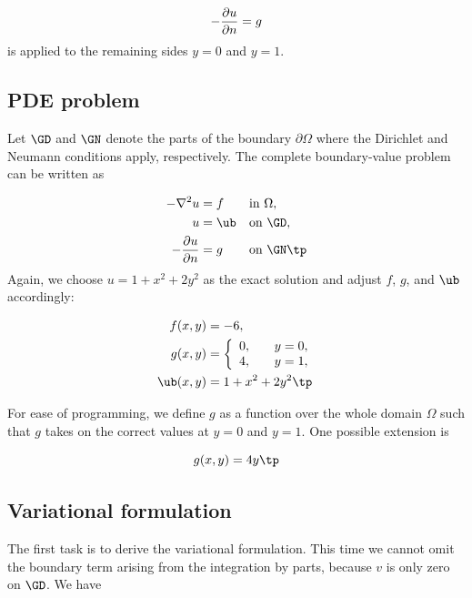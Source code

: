 \documentclass[graybox,envcountchap,sectrefs,final]{svmonodo}
\begin{document}
\begin{equation*}
-{\partial u\over\partial n}=g
\end{equation*}
is applied to the remaining
sides $y=0$ and $y=1$.



\subsection{PDE problem}

Let $\GD$ and $\GN$ denote the parts of the boundary $\partial\Omega$
where the Dirichlet and Neumann conditions apply, respectively. The
complete boundary-value problem can be written as

\begin{alignat}{2}
    - \nabla^2 u &= f \quad&&\mbox{in } \Omega,  \\
    u &= \ub &&\mbox{on } \GD,       \\
    - {\partial u\over\partial n} &= g &&\mbox{on } \GN  \tp
\end{alignat}
Again, we choose $u=1+x^2 + 2y^2$ as the exact solution and adjust $f$, $g$, and
$\ub$ accordingly:

\begin{align*}
f(x, y) &= -6,\\
g(x, y) &= \left\lbrace\begin{array}{ll}
0, & \quad y=0,\\
4, & \quad y=1,
\end{array}\right.\\
\ub(x, y) &= 1 + x^2 + 2y^2\tp
\end{align*}

For ease of programming, we define $g$ as a function over the whole
domain $\Omega$ such that $g$ takes on the correct values at $y=0$ and
$y=1$. One possible extension is

\begin{equation*}
g(x,y) = 4y\tp
\end{equation*}

\subsection{Variational formulation}

The first task is to derive the variational formulation. This time we cannot
omit the boundary term arising from the integration by parts, because
$v$ is only zero on $\GD$. We have
\end{document}
